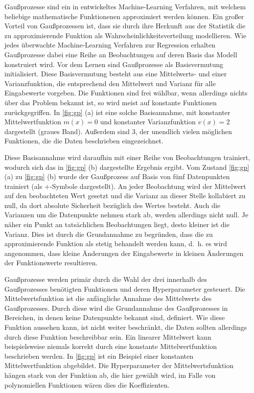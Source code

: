 Gaußprozesse sind ein in \cite{Rasmussen.2008} entwickeltes Machine-Learning Verfahren, mit welchem beliebige mathematische Funktionenen approximiert werden können.
Ein großer Vorteil von Gaußprozessen ist, dass sie durch ihre Herkunft aus der Statistik die zu approximierende Funktion als Wahrscheinlichkeitsverteilung modellieren.
Wie jedes überwachte Machine-Learning Verfahren zur Regression erhalten Gaußprozesse dabei eine Reihe an Beobachtungen auf deren Basis das Modell konstruiert wird.
Vor dem Lernen sind Gaußprozesse als Basisvermutung initialisiert.
Diese Basisvermutung besteht aus eine Mittelwerts- und einer Varianzfunktion, die entsprechend den Mittelwert und Varianz für alle Eingabewerte vorgeben.
Die Funktionen sind frei wählbar, wenn allerdings nichts über das Problem bekannt ist, so wird meist auf konstante Funktionen zurückgegriffen.
In \cref{fig:gp} (a) ist eine solche Basisannahme, mit konstanter Mittelwertfunktion $m(x)=0$ und konstanter Varianzfunktion $v(x)=2$ dargestellt (graues Band).
Außerdem sind 3, der unendlich vielen möglichen Funktionen, die die Daten beschrieben eingezeichnet.

Diese Basisannahme wird daraufhin mit einer Reihe von Beobachtungen trainiert, wodurch sich das in \cref{fig:gp} (b) dargestellte Ergebnis ergibt.
Vom Zustand \cref{fig:gp} (a) zu \cref{fig:gp} (b) wurde der Gaußprozess auf Basis von fünf Datenpunkten trainiert (als $+$-Symbole dargestellt).
An jeder Beobachtung wird der Mittelwert auf den beobachteten Wert gesetzt und die Varianz an dieser Stelle kollabiert zu null, da dort absolute Sicherheit bezüglich des Wertes besteht.
Auch die Varianzen um die Datenpunkte nehmen stark ab, werden allerdings nicht null.
Je näher ein Punkt an tatsächlichen Beobachtungen liegt, desto kleiner ist die Varianz.
Dies ist durch die Grundannahme zu begründen, dass die zu approximierende Funktion als stetig behandelt werden kann, d.~h. es wird angenommen, dass kleine Änderungen der Eingabewerte in kleinen Änderungen der Funktionswerte resultieren.

Gaußprozesse werden primär durch die Wahl der drei innerhalb des Gaußprozesses benötigten Funktionen und deren Hyperparameter gesteuert.
Die Mittelwertsfunktion ist die anfängliche Annahme des Mittelwerts des Gaußprozesses.
Durch diese wird die Grundannahme des Gaußprozesses in Bereichen, in denen keine Datenpunkte bekannt sind, definiert.
Wie diese Funktion aussehen kann, ist nicht weiter beschränkt, die Daten sollten allerdings durch diese Funktion beschreibbar sein.
Ein linearer Mittelwert kann beispielsweise niemals korrekt durch eine konstante Mittelwertfunktion beschrieben werden.
In \cref{fig:gp} ist ein Beispiel einer konstanten Mittelwertfunktion abgebildet.
Die Hyperparameter der Mittelwertsfunktion hängen stark von der Funktion ab, die hier gewählt wird, im Falle von polynomiellen Funktionen wären dies die Koeffizienten.

